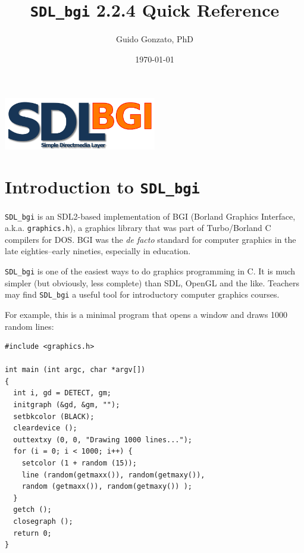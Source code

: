 \documentclass[a4paper,11pt]{article}
\newcommand{\SDLbgi}{\texttt{SDL\_bgi}}
\newcommand{\version}{2.2.4}        %
\begin{document}
\title{\SDLbgi{} \version{} Quick Reference}

\author{Guido Gonzato, PhD}

\date{\today}

\maketitle

\begin{center}
  \includegraphics[width=0.5\textwidth]{SDL_bgi_logo.png}  
\end{center}

\tableofcontents


\section{Introduction to \SDLbgi}

\SDLbgi{} is an SDL2-based implementation of BGI (Borland Graphics
Interface, a.k.a. \texttt{graphics.h}), a graphics library that was
part of Turbo/Borland C compilers for DOS. BGI was the \emph{de facto}
standard for computer graphics in the late eighties--early nineties,
especially in education.

\SDLbgi{} is one of the easiest ways to do graphics programming in C.
It is much simpler (but obviously, less complete) than SDL, OpenGL and
the like. Teachers may find \SDLbgi{} a useful tool for introductory
computer graphics courses.

For example, this is a minimal program that opens a window and draws
1000 random lines:

\begin{small}
\begin{spacing}{0.9}
\begin{verbatim}
#include <graphics.h>

int main (int argc, char *argv[])
{
  int i, gd = DETECT, gm;
  initgraph (&gd, &gm, "");
  setbkcolor (BLACK);
  cleardevice ();
  outtextxy (0, 0, "Drawing 1000 lines...");
  for (i = 0; i < 1000; i++) {
    setcolor (1 + random (15));
    line (random(getmaxx()), random(getmaxy()),
    random (getmaxx()), random(getmaxy()) );
  }
  getch ();
  closegraph ();
  return 0;
}
\end{verbatim}
\end{spacing}
\end{small}
\end{document}
